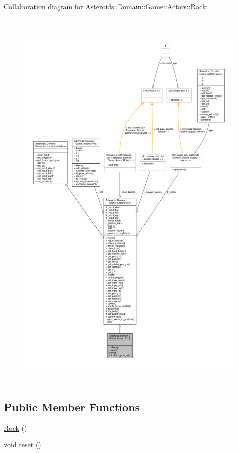 Collaboration diagram for Asteroids\+:\+:Domain\+:\+:Game\+:\+:Actors\+:\+:Rock\+:\nopagebreak
\begin{figure}[H]
\begin{center}
\leavevmode
\includegraphics[height=550pt]{classAsteroids_1_1Domain_1_1Game_1_1Actors_1_1Rock__coll__graph}
\end{center}
\end{figure}
\subsection*{Public Member Functions}
\begin{DoxyCompactItemize}
\item 
\hyperlink{classAsteroids_1_1Domain_1_1Game_1_1Actors_1_1Rock_aef8f46670fe5751800b9d76079adb5e5}{Rock} ()
\item 
void \hyperlink{classAsteroids_1_1Domain_1_1Game_1_1Actors_1_1Rock_aab44647e08659d563aeb28d51868fb86}{reset} ()
\end{DoxyCompactItemize}
